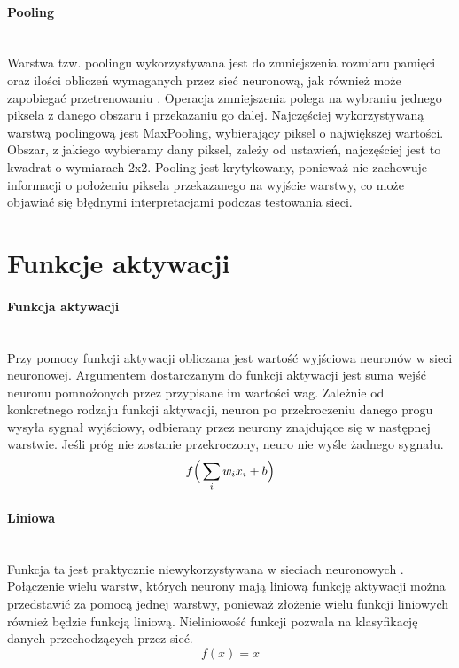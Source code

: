 \paragraph{Pooling} \mbox{}\\
Warstwa tzw. poolingu wykorzystywana jest do zmniejszenia rozmiaru pamięci oraz ilości obliczeń
wymaganych przez sieć neuronową, jak również może zapobiegać przetrenowaniu \cite{CS231n}. Operacja zmniejszenia
polega na wybraniu jednego piksela z danego obszaru i przekazaniu go dalej. Najczęściej wykorzystywaną
warstwą poolingową jest MaxPooling, wybierający piksel o największej wartości. Obszar, z jakiego
wybieramy dany piksel, zależy od ustawień, najczęściej jest to kwadrat o wymiarach 2x2. Pooling
jest krytykowany, ponieważ nie zachowuje informacji o położeniu piksela przekazanego na wyjście
warstwy, co może objawiać się błędnymi interpretacjami podczas testowania sieci.

\section{Funkcje aktywacji}
\paragraph{Funkcja aktywacji} \mbox{}\\
Przy pomocy funkcji aktywacji obliczana jest wartość wyjściowa neuronów w sieci
neuronowej. Argumentem dostarczanym do funkcji aktywacji jest suma wejść neuronu
pomnożonych przez przypisane im wartości wag. Zależnie od konkretnego rodzaju funkcji
aktywacji, neuron po przekroczeniu danego progu wysyła sygnał wyjściowy, odbierany
przez neurony znajdujące się w następnej warstwie. Jeśli próg nie zostanie przekroczony,
neuro nie wyśle żadnego sygnału.
\begin{equation}
f\Big(\sum_{i}w_{i}x_{i} + b\Big) \\
\end{equation}

\paragraph{Liniowa} \mbox{}\\
Funkcja ta jest praktycznie niewykorzystywana w sieciach neuronowych \cite{activationFunctions}.
Połączenie wielu warstw, których neurony mają liniową funkcję aktywacji można przedstawić
za pomocą jednej warstwy, ponieważ złożenie wielu funkcji liniowych również będzie
funkcją liniową. Nieliniowość funkcji pozwala na klasyfikację danych przechodzących
przez sieć.
\begin{equation}
f(x) = x
\end{equation}

